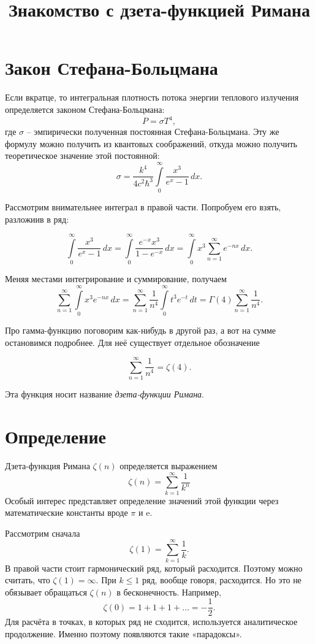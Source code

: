 \documentclass{ncc}
\title{Знакомство с дзета-функцией Римана}
\begin{document}
\maketitle
\tableofcontents
\section{Закон Стефана-Больцмана}

Если вкратце, то интегральная плотность потока энергии теплового излучения определяется законом Стефана-Больцмана:
\[
    P = \sigma T^4,
\]
где \( \sigma \) -- эмпирически полученная постоянная Стефана-Больцмана.
Эту же формулу можно получить из квантовых соображений, откуда можно получить теоретическое значение этой постоянной:
\[
    \sigma = \frac{k^4}{4 c^2\hbar^3}\int\limits_0^\infty\frac{x^3}{e^x-1}\,dx.
\]

Рассмотрим внимательнее интеграл в правой части. Попробуем его взять, разложиив в ряд:

\[
    \int\limits_0^\infty\frac{x^3}{e^x-1}\,dx = \int\limits_0^\infty\frac{e^{-x}x^3}{1-e^{-x}}\,dx = \int\limits_0^\infty x^3 \sum\limits_{n=1}^\infty e^{-nx}\,dx.
\]

Меняя местами интегрирование и суммирование, получаем
\[
    \sum\limits_{n=1}^\infty \int\limits_0^\infty x^3  e^{-nx}\,dx = \sum\limits_{n=1}^\infty\frac{1}{n^4} \int\limits_0^\infty t^3  e^{-t}\,dt =
    \Gamma(4)\sum\limits_{n=1}^\infty\frac{1}{n^4}.
\]

Про гамма-функцию поговорим как-нибудь в другой раз, а вот на сумме остановимся подробнее. Для неё существует отдельное обозначение

\[
    \sum\limits_{n=1}^\infty\frac{1}{n^4} = \zeta(4).
\]

Эта функция носит название \emph{дзета-функции Римана}.

\section{Определение}
Дзета-функция Римана \( \zeta(n) \) определяется выражением
\[
    \zeta(n) = \sum\limits_{k=1}^\infty \frac{1}{k^n}
\]
Особый интерес представляет определение значений этой функции через математические константы вроде \(\pi\) и \(\mathrm{e}\).

Рассмотрим сначала
\[
    \zeta(1) = \sum\limits_{k=1}^\infty \frac{1}{k}.
\]
В правой части стоит гармонический ряд, который расходится. Поэтому можно считать, что \( \zeta(1) = \infty \). При \( k \le 1 \) ряд, вообще говоря, расходится. Но это не обязывает обращаться \( \zeta(n) \) в бесконечность. Например,
\[
    \zeta(0) = 1 + 1 + 1 + \ldots = -\frac{1}{2}.
\]
Для расчёта в точках, в которых ряд не сходится, используется аналитическое продолжение. Именно поэтому появляются такие «парадоксы».
\end{document}
